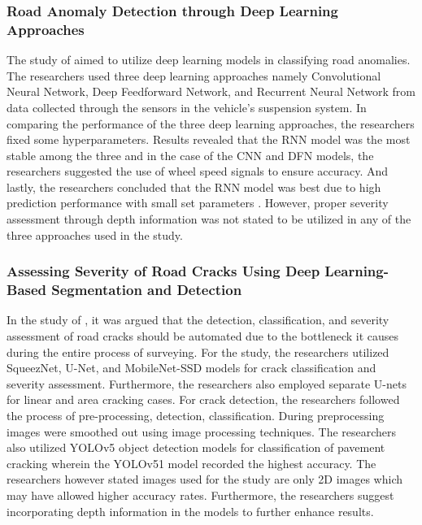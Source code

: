 \subsubsection{Road Anomaly Detection through Deep Learning Approaches}
The study of  aimed to utilize deep learning models in classifying road anomalies. The researchers used three deep learning approaches namely Convolutional Neural Network, Deep Feedforward Network, and Recurrent Neural Network from data collected through the sensors in the vehicle's suspension system. In comparing the performance of the three deep learning approaches, the researchers fixed some hyperparameters. Results revealed that the RNN model was the most stable among the three and in the case of the CNN and DFN models, the researchers suggested the use of wheel speed signals to ensure accuracy. And lastly, the researchers concluded that the RNN model was best due to high prediction performance with small set parameters \cite{luo2020}. However, proper severity assessment through depth information was not stated to be utilized in any of the three approaches used in the study.

\subsubsection{Assessing Severity of Road Cracks Using Deep Learning-Based Segmentation and Detection}
In the study of , it was argued that the detection, classification, and severity assessment of road cracks should be automated due to the bottleneck it causes during the entire process of surveying. For the study, the researchers utilized SqueezNet, U-Net, and MobileNet-SSD models for crack classification and severity assessment. Furthermore, the researchers also employed separate U-nets for linear and area cracking cases. For crack detection, the researchers followed the process of pre-processing, detection, classification. During preprocessing images were smoothed out using image processing techniques. The researchers also utilized YOLOv5 object detection models for classification of pavement cracking wherein the YOLOv51 model recorded the highest accuracy. The researchers however stated images used for the study are only 2D images which may have allowed higher accuracy rates. Furthermore, the researchers suggest incorporating depth information in the models to further enhance results.


